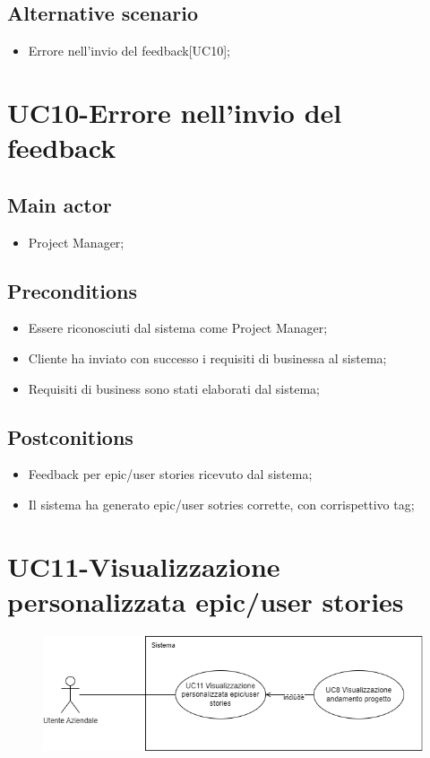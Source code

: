 \documentclass{article}
\begin{document}
    \subsection*{Alternative scenario}
        
        \begin{itemize}
            \item Errore nell'invio del feedback[UC10];
        \end{itemize}
        
\section{UC10-Errore nell'invio del feedback}

     \subsection*{Main actor}
     \begin{itemize}
         \item Project Manager;
     \end{itemize}
   \subsection*{Preconditions}
        \begin{itemize}
            \item Essere riconosciuti dal sistema come Project Manager;
            \item Cliente ha inviato con successo i requisiti di businessa al sistema;
            \item Requisiti di business sono stati elaborati dal sistema;
        \end{itemize}
        
    \subsection*{Postconitions}
        \begin{itemize}
            \item Feedback per epic/user stories ricevuto dal sistema;
            \item Il sistema ha generato epic/user sotries corrette, con corrispettivo tag;
        \end{itemize} 

  
\section{UC11-Visualizzazione personalizzata epic/user stories}
    \begin{figure}[h]
      \centering
      \includegraphics[width=.8\textwidth, height=.6\textheight, keepaspectratio]{./imgUML/UC11.png}
      \label{fig:immagine}
    \end{figure}
    
\end{document}
